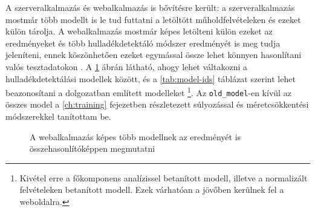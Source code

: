 A szerveralkalmazás és webalkalmazás is bővítésre került: a szerveralkalmazás mostmár több modellt is le tud futtatni a letöltött műholdfelvételeken és ezeket külön tárolja. A webalkalmazás mostmár képes letölteni külön ezeket az eredményeket és több hulladékdetektáló módszer eredményét is meg tudja jeleníteni, ennek köszönhetően ezeket egymással össze lehet könnyen hasonlítani valós tesztadatokon \cite{wastedetection2024}. A \ref{fig:waste-detection-demo} ábrán látható, ahogy lehet váltakozni a hulladékdetektálási modellek között, és a \ref{tab:model-ids} táblázat szerint lehet beazonosítani a dolgozatban említett modelleket \footnote{Kivétel erre a főkomponens analízissel betanított modell, illetve a normalizált felvételeken betanított modell. Ezek várhatóan a jövőben kerülnek fel a weboldalra.}. Az \texttt{old\_model}-en kívül az összes model a \ref{ch:training} fejezetben részletezett súlyozással és méretcsökkentési módszerekkel tanítottam be.

\begin{figure}[H]
	\centering
	\hspace{5pt}
	\caption{A webalkalmazás képes több modellnek az eredményét is összehasonlítóképpen megmutatni}
	\label{fig:waste-detection-demo}
\end{figure}

